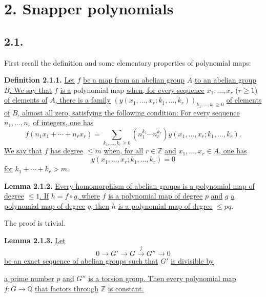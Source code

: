 %

\section*{2. Snapper polynomials}

\subsection*{2.1.}
First recall the definition and some elementary properties of polynomial maps:

\textbf{Definition 2.1.1.} \uline{Let} $f$ \uline{be a map from an abelian group} $A$ \uline{to an abelian group} $B$\uline{. We say that} $f$ \uline{is a} polynomial map \uline{when, for every sequence} $x_1,\ldots,x_r$ ($r\geq1$\uline{) of elements of} $A$\uline{, there is a family} $(y(x_1,\ldots,x_r;k_1,\ldots,k_r))_{k_1,\ldots,k_r\geq0}$ \uline{of elements of} $B$\uline{, almost all zero, satisfying the following condition: For every sequence} $n_1,\ldots,n_r$ \uline{of integers, one has}
\[
f(n_1x_1+\cdots+n_rx_r)=
\sum_{k_1,\ldots,k_r\geq0}(n_1^{k_1}\cdots n_r^{k_r})
y(x_1,\ldots,x_r;k_1,\ldots,k_r).
\]
\uline{We say that} $f$ \uline{has degree} $\leq m$ \uline{when, for all} $r\in\mathbb Z$ \uline{and} $x_1,\ldots,x_r\in A$\uline{, one has}
\[
y(x_1,\ldots,x_r;k_1,\ldots,k_r)=0
\]
\uline{for} $k_1+\cdots+k_r>m$.

\textbf{Lemma 2.1.2.} \uline{Every homomorphism of abelian groups is a polynomial map of degree} $\leq1$\uline{. If} $h=f\circ g$\uline{, where} $f$ \uline{is a polynomial map of degree} $p$ \uline{and} $g$ \uline{a polynomial map of degree} $q$\uline{, then} $h$ \uline{is a polynomial map of degree} $\leq pq$.

The proof is trivial.

\textbf{Lemma 2.1.3.} \uline{Let}
\[
0\longrightarrow G'\longrightarrow G\xrightarrow{j}G''\longrightarrow0
\]
\uline{be an exact sequence of abelian groups such that} $G'$ \uline{is divisible by}


%

\uline{a prime number} $p$ \uline{and} $G''$ \uline{is a torsion group. Then every polynomial map} $f:G\to\mathbb Q$ \uline{that factors through} $\mathbb Z$ \uline{is constant.}

